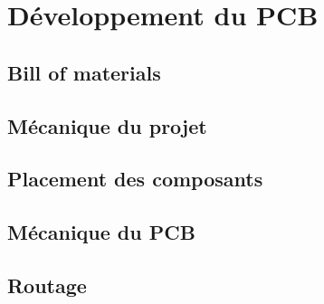 \section{Développement du PCB} \label{sec:Dev-PCB}

\subsection{Bill of materials} \label{ssec:BOM}

\subsection{Mécanique du projet} \label{ssec:mechProjet}

\subsection{Placement des composants} \label{ssec:placementComp}

\subsection{Mécanique du PCB} \label{ssec:Mech-PCB}

\subsection{Routage} \label{ssec:routage}

